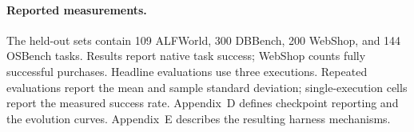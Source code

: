 \paragraph{Reported measurements.}
The held-out sets contain 109 ALFWorld, 300 DBBench, 200 WebShop, and 144 OSBench tasks. Results report native task success; WebShop counts fully successful purchases. Headline evaluations use three executions. Repeated evaluations report the mean and sample standard deviation; single-execution cells report the measured success rate. Appendix~D defines checkpoint reporting and the evolution curves. Appendix~E describes the resulting harness mechanisms.

